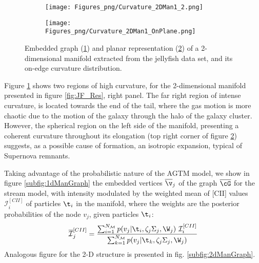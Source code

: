 \begin{figure}[ht]
\centering
\begin{subfigure}[t]{0.48\textwidth}
 \label{subfig:CurvJF}
 \caption{}
 \texttt{[image: Figures\_png/Curvature\_2DMan1\_2.png]}
\end{subfigure}
\begin{subfigure}[t]{0.49\textwidth}
 \label{subfig:CurvJF_Plane}
 \caption{}
 \texttt{[image: Figures\_png/Curvature\_2DMan1\_OnPlane.png]}
\end{subfigure}
\caption{Embedded graph (\ref{subfig:CurvJF}) and planar representation (\ref{subfig:CurvJF_Plane}) of a 2-dimensional manifold extracted from the jellyfish data set, and its on-edge curvature distribution.}
\label{fig:curvatureJF}
\end{figure}

Figure \ref{subfig:CurvJF} shows two regions of high curvature, for the 2-dimensional manifold presented in figure \ref{fig:JF_Res}, right panel. The far right region of intense curvature, is located towards the end of the tail, where the gas motion is more chaotic due to the motion of the galaxy through the halo of the galaxy cluster. However, the spherical region on the left side of the manifold, presenting a coherent curvature throughout its elongation (top right corner of figure \ref{subfig:CurvJF_Plane}) suggests, as a possible cause of formation, an isotropic expansion, typical of Supernova remnants. 

Taking advantage of the probabilistic nature of the AGTM model, we show in figure \ref{subfig:1dManGraph} the embedded vertices
$\overline{\v}_j$ of the graph $\overline{\cG}$
for the stream model, with intensity modulated by the weighted mean of [CII] values $\mathcal{I}^{[CII]}_i$ of particles $\t_i$ in the manifold, where the weights are the posterior probabilities of the node $v_j$, given  particles $\t_i$:
\begin{equation}\label{eq:WeightedVar}
    \overline{\mathcal{I}}^{[CII]}_j = \frac{\sum_{i=1}^{N_{\mathcal{M}}} p(v_j | \t_i,\zeta_j\Sigma_j,\W_j) ~ \mathcal{I}^{[CII]}_i}{\sum_{k=1}^{N_{\mathcal{M}}} p(v_j | \t_k,\zeta_j\Sigma_j,\W_j)}
\end{equation}
Analogous figure for the 2-D structure is presented in fig. \ref{subfig:2dManGraph}.

